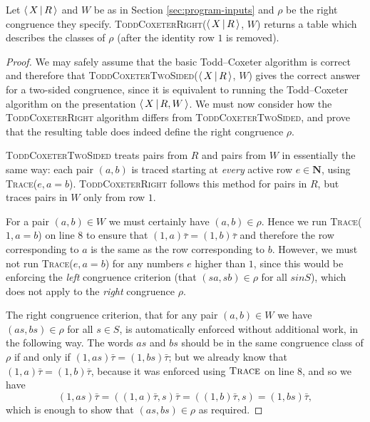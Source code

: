\begin{theorem}
  Let $\left\langle \, X \, \middle| \, R \, \right\rangle$ and $W$ be as in Section \ref{sec:program-inputs} and $\rho$
  be the right congruence they specify.
  \textsc{ToddCoxeterRight($\left\langle \, X \, \middle| \, R \, \right\rangle$, $W$)} returns a table which describes the
  classes of $\rho$ (after the identity row $1$ is removed).
  \begin{proof}
    We may safely assume that the basic Todd--Coxeter algorithm is correct
    \cite{todd_coxeter_1936, beetham_campbell_1976} and therefore that
    \textsc{ToddCoxeterTwoSided($\left\langle \, X \, \middle| \, R \, \right\rangle$, $W$)} gives the correct answer for a
    two-sided congruence, since it is equivalent to running the Todd--Coxeter algorithm on the
    presentation $\left\langle \, X \, \middle| \, R,W \, \right\rangle$.  We must now consider how
    the \textsc{ToddCoxeterRight} algorithm differs from \textsc{ToddCoxeterTwoSided}, and
    prove that the resulting table does indeed define the right congruence
    $\rho$.

    \textsc{ToddCoxeterTwoSided} treats pairs from $R$ and pairs from $W$ in
    essentially the same way: each pair $(a,b)$ is traced starting at
    \textit{every} active row $e \in \mathbf{N}$, using
    \textsc{Trace}($e, a=b$).  \textsc{ToddCoxeterRight} follows this method for
    pairs in $R$, but traces pairs in $W$ only from row $1$.

    For a pair $(a,b) \in W$ we must certainly have $(a,b) \in \rho$.  Hence we
    run \textsc{Trace($1, a=b$)} on line 8 to ensure that $(1,a)\bar\tau = (1,b)\bar\tau$
    and therefore the row corresponding to $a$ is the same as the row
    corresponding to $b$.  However, we must not run \textsc{Trace($e, a=b$)} for
    any numbers $e$ higher than $1$, since this would be enforcing the
    \textit{left} congruence criterion
    (that $(sa, sb) \in \rho$ for all $s in S$), which does not apply to the
    \textit{right} congruence $\rho$.

    The right congruence criterion, that for any pair $(a,b) \in W$ we have
    $(as, bs) \in \rho$ for all $s \in S$, is automatically enforced without
    additional work, in the following way.  The words $as$ and $bs$ should be in
    the same congruence class of $\rho$ if and only if
    $(1, as)\bar\tau = (1, bs)\bar\tau$; but we already know that
    $(1, a)\bar\tau = (1, b)\bar\tau$, because it was enforced using
    $\textsc{Trace}$ on line 8, and so we have
    $$(1, as)\bar\tau
    = ((1, a)\bar\tau, s)\bar\tau
    = ((1, b)\bar\tau, s)
    = (1, bs)\bar\tau,$$
    which is enough to show that $(as, bs) \in \rho$ as required.
  \end{proof}
\end{theorem}

